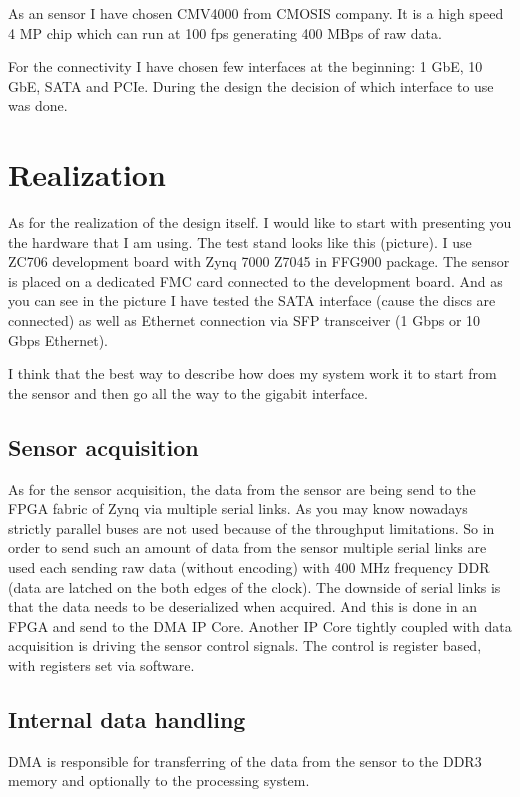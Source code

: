 \documentclass[10pt,a4paper]{article}
\begin{document}
As an sensor I have chosen CMV4000 from CMOSIS company. It is a high speed 4 MP chip which can run at 100 fps generating 400 MBps of raw data. 

For the connectivity I have chosen few interfaces at the beginning: 1 GbE, 10 GbE, SATA and PCIe. During the design the decision of which interface to use was done. 

\section{Realization}
As for the realization of the design itself. I would like to start with presenting you the hardware that I am using.  The test stand looks like this (picture). I use ZC706 development board with Zynq 7000 Z7045 in FFG900 package. The sensor is placed on a dedicated FMC card connected to the development board. And as you can see in the picture I have tested the SATA interface (cause the discs are connected) as well as Ethernet connection via SFP transceiver (1 Gbps or 10 Gbps Ethernet).

I think that the best way to describe how does my system work it to start from the sensor and then go all the way to the gigabit interface. 

\subsection{Sensor acquisition}
As for the sensor acquisition, the data from the sensor are being send to the FPGA fabric of Zynq via multiple serial links. As you may know nowadays strictly parallel buses are not used because of the throughput limitations. So in order to send such an amount of data from the sensor multiple serial links are used each sending raw data (without encoding) with 400 MHz frequency DDR (data are latched on the both edges of the clock). The downside of serial links is that the data needs to be deserialized when acquired. And this is done in an FPGA and send to the DMA IP Core. Another IP Core tightly coupled with data acquisition is driving the sensor control signals. The control is register based, with registers set via software. 

\subsection{Internal data handling}
DMA is responsible for transferring of the data from the sensor to the DDR3 memory and optionally to the processing system. 
\end{document}
